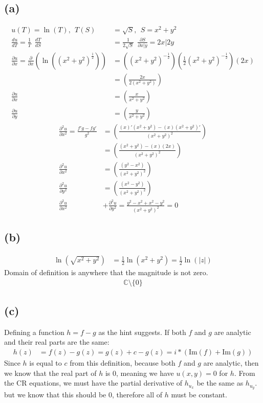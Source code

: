 \documentclass{article}
\newcommand{\der}[2]{\frac{d#1}{d#2}}
\newcommand{\parder}[2]{\frac{\partial#1}{\partial#2}}
\newcommand{\secparder}[2]{\frac{\partial^2#1}{\partial#2^2}}
\begin{document}
\subsection*{(a)}
\begin{align*}
  u(T) = \ln(T),\ \ T(S) &= \sqrt{S}, \ \ S = x^2+y^2 \\ 
  \der{u}{T} = \frac{1}{T} \ \ \der{T}{S} &= \frac{1}{2\sqrt{S}}\ \ \parder{S}{x|y} = 2x|2y\\
  \parder{u}{x} = \parder{}{x}(\ln{((x^2+y^2)^{\frac{1}{2}})}) &= ((x^2+y^2)^{-\frac{1}{2}})\left(\frac{1}{2}(x^2+y^2)^{-\frac{1}{2}}\right)(2x) \\
  &=\left(\frac{2x}{2(x^2+y^2)}\right)\\
  \parder{u}{x} &=\left(\frac{x}{x^2+y^2}\right)\\
  \parder{u}{y} &= \left(\frac{y}{x^2+y^2}\right)
\end{align*}
\begin{align*}
  \secparder{u}{x} =\frac{f'g-fg'}{g^2} &= \left(\frac{(x)'(x^2+y^2)-(x)(x^2+y^2)'}{(x^2+y^2)^2}\right)\\
                                        &= \left(\frac{(x^2+y^2)-(x)(2x)}{(x^2+y^2)^2}\right)\\
  \secparder{u}{x} &= \left(\frac{(y^2-x^2)}{(x^2+y^2)^2}\right)\\
  \secparder{u}{y}&= \left(\frac{(x^2-y^2)}{(x^2+y^2)^2}\right)\\
  \secparder{u}{x} &+ \secparder{u}{y} =  \frac{y^2-x^2 + x^2-y^2}{(x^2+y^2)^2} = 0
\end{align*}
\subsection*{(b)}
\begin{align*}
  \ln{(\sqrt{x^2+y^2})} &= \frac{1}{2}\ln{(x^2+y^2)} = \frac{1}{2}\ln{(|z|)}
\end{align*}
Domain of definition is anywhere that the magnitude is not zero.
\begin{align*}
  \mathbb{C}\setminus \{0\}
\end{align*}
\subsection*{(c)}
Defining a function $h=f-g$ as the hint suggests. If both $f$ and $g$ are analytic and their real parts are the same:
\begin{align*}
  h(z) &= f(z) - g(z) = g(z) + c - g(z) =  i*(\text{Im}{(f)} + \text{Im}(g)) 
\end{align*}
Since $h$ is equal to $c$ from this definition, because both $f$ and $g$ are analytic, then we know that the real part of $h$ is $0$, meaning we have $u(x,y) = 0$ for  $h$. From the CR equations, we must have the partial derivative of $h_{u_x}$ be the same as $h_{u_y}$. but we know that this should be $0$, therefore all of $h$ must be constant.
\end{document}
